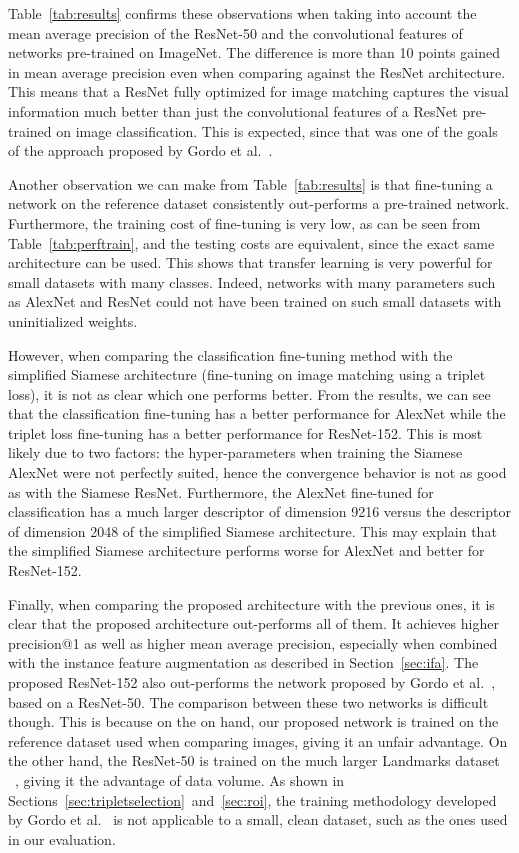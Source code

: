 Table~\ref{tab:results} confirms these observations when taking into
account the mean average precision of the ResNet-50
and the convolutional features of networks pre-trained on ImageNet.
The difference is more than 10 points gained in mean
average precision even when comparing against the ResNet architecture.
This means that a ResNet fully optimized for image matching captures the
visual information much better than just the convolutional features
of a ResNet pre-trained on image classification.
This is expected, since that was one of the
goals of the approach proposed by Gordo et al.~\cite{gordo_deep_2016}.

Another observation we can make from Table~\ref{tab:results} is that
fine-tuning a network on the reference dataset consistently out-performs
a pre-trained network. Furthermore, the training cost of fine-tuning is
very low, as can be seen from Table~\ref{tab:perftrain}, and the testing
costs are equivalent, since the exact same architecture can be used.
This shows that transfer learning is very powerful for small datasets with
many classes. Indeed, networks with many parameters such as AlexNet and
ResNet could not have been trained on such small datasets with
uninitialized weights.

However, when comparing the classification fine-tuning method with the
simplified Siamese architecture (fine-tuning on image matching using a triplet loss),
it is not as clear which one performs better.
From the results, we can see that the classification fine-tuning has a better
performance for AlexNet while the triplet loss fine-tuning has a better
performance for ResNet-152. This is most likely due to two factors: the
hyper-parameters when training the Siamese AlexNet were not perfectly
suited, hence the convergence behavior is not as good as with the Siamese
ResNet. Furthermore, the AlexNet fine-tuned for classification has a much
larger descriptor of dimension 9216 versus the descriptor of dimension
2048 of the simplified Siamese architecture. This may explain that
the simplified Siamese architecture performs worse for AlexNet and
better for ResNet-152.

Finally, when comparing the proposed architecture with the previous ones,
it is clear that the proposed architecture out-performs all of them.
It achieves higher precision@1 as well as higher mean average precision,
especially when combined with the instance feature augmentation as described
in Section~\ref{sec:ifa}. The proposed ResNet-152 also out-performs the
network proposed by Gordo et al.~\cite{gordo_deep_2016}, based on a ResNet-50.
The comparison between these two networks is difficult though.
This is because on the on hand, our proposed
network is trained on the reference dataset used when comparing images,
giving it an unfair advantage. On the other hand, the ResNet-50
is trained on the much larger Landmarks dataset
~\cite{babenko_neural_2014}, giving it the advantage of data volume.
As shown in Sections~\ref{sec:tripletselection}~and~\ref{sec:roi},
the training methodology developed by Gordo et al.~\cite{gordo_end--end_2017}
is not applicable to a small, clean dataset, such as the ones used in our
evaluation.


